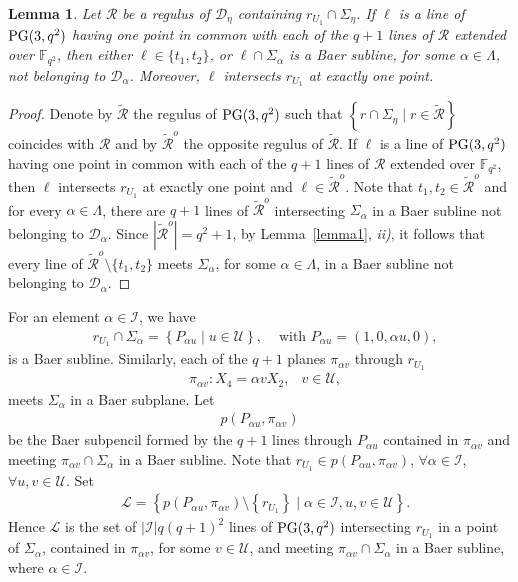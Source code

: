 \documentclass[11pt]{article}
\newtheorem{lemma}[theorem]{Lemma}
\theoremstyle{definition}
\numberwithin{equation}{section}
\def\cI{\mathcal I}
\def\cL{\mathcal L}
\def\cD{\mathcal D}
\def\cU{\mathcal U}
\def\cR{\mathcal R}
\def\PG{{\rm PG}}
\def\F{{\mathbb F}}
\begin{document}
\begin{lemma}\label{prop0} 
    Let $\cR$ be a regulus of $\cD_{\eta}$ containing $r_{U_1} \cap \Sigma_{\eta}$. If $\ell$ is a line of $\PG(3, q^2)$ having one point in common with each of the $q+1$ lines of $\cR$ extended over $\F_{q^2}$, then either $\ell \in \{t_1, t_2\}$, or $\ell \cap \Sigma_{\alpha}$ is a Baer subline, for some $\alpha \in \Lambda$, not belonging to $\cD_{\alpha}$. Moreover, $\ell$ intersects $r_{U_1}$ at exactly one point. 
\end{lemma}
\begin{proof}
Denote by $\tilde{\cR}$ the regulus of $\PG(3, q^2)$ such that $\left\{r \cap \Sigma_{\eta} \mid r \in \tilde{\cR}\right\}$ coincides with $\cR$ and by $\tilde{\cR}^o$ the opposite regulus of $\tilde{\cR}$. If $\ell$ is a line of $\PG(3, q^2)$ having one point in common with each of the $q+1$ lines of $\cR$ extended over $\F_{q^2}$, then $\ell$ intersects $r_{U_1}$ at exactly one point and $\ell \in \tilde{\cR}^o$. Note that $t_1, t_2 \in \tilde{\cR}^o$ and for every $\alpha \in \Lambda$, there are $q+1$ lines of $\tilde{\cR}^o$ intersecting $\Sigma_{\alpha}$ in a Baer subline not belonging to $\cD_{\alpha}$. Since $\left|\tilde{\cR}^o\right| = q^2+1$, by Lemma~\ref{lemma1}, {\em ii)}, it follows that every line of $\tilde{\cR}^o \setminus \{t_1, t_2\}$ meets $\Sigma_{\alpha}$, for some $\alpha \in \Lambda$, in a Baer subline not belonging to $\cD_{\alpha}$.    
\end{proof}

For an element $\alpha \in \cI$, we have
\begin{align*}
& r_{U_1} \cap \Sigma_{\alpha} = \left\{P_{\alpha u} \mid u \in \cU\right\}, & \mbox{ with } P_{\alpha u} = (1,0,\alpha u, 0),
\end{align*}
is a Baer subline. Similarly, each of the $q+1$ planes $\pi_{\alpha v}$ through $r_{U_1}$ 
\begin{align*}
& \pi_{\alpha v}: X_4 = \alpha v X_2, & v \in \cU,
\end{align*}
meets $\Sigma_{\alpha}$ in a Baer subplane. Let 
\begin{align*}
p\left(P_{\alpha u}, \pi_{\alpha v}\right)
\end{align*}
be the Baer subpencil formed by the $q+1$ lines through $P_{\alpha u}$ contained in $\pi_{\alpha v}$ and meeting $\pi_{\alpha v} \cap \Sigma_{\alpha}$ in a Baer subline. Note that $r_{U_1} \in p\left(P_{\alpha u}, \pi_{\alpha v}\right)$, $\forall \alpha \in \cI$, $\forall u, v \in \cU$. Set
\begin{align*}
& \cL = \left\{p\left(P_{\alpha u}, \pi_{\alpha v}\right) \setminus \left\{r_{U_1}\right\} \mid \alpha \in \cI, u, v \in \cU \right\}.
\end{align*} 
Hence $\cL$ is the set of $|\cI| q(q+1)^2$ lines of $\PG(3, q^2)$ intersecting $r_{U_1}$ in a point of $\Sigma_{\alpha}$, contained in $\pi_{\alpha v}$, for some $v \in \cU$, and meeting $\pi_{\alpha v} \cap \Sigma_{\alpha}$ in a Baer subline, where $\alpha \in \cI$. 
\end{document}
